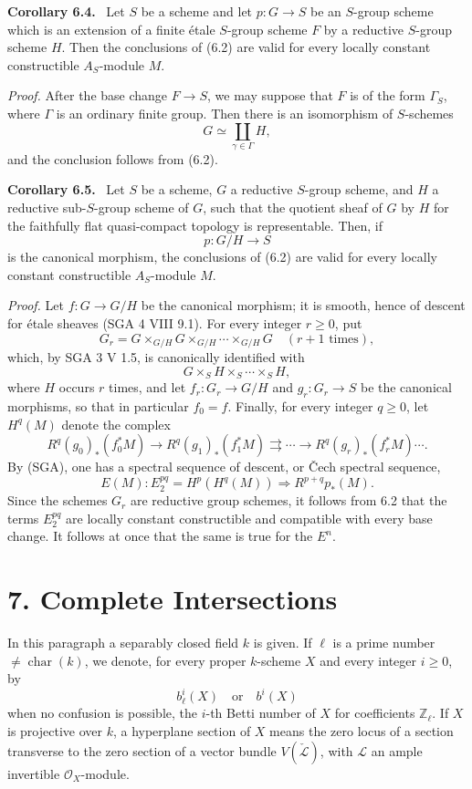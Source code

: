 \documentclass[11pt]{article}
\newenvironment{statement}[1]{\par\medskip\noindent\textbf{#1.}\ }{\par\medskip}
\begin{document}
\begin{statement}{Corollary 6.4}
Let $S$ be a scheme and let $p:G\to S$ be an $S$-group scheme which is an extension of a finite étale $S$-group scheme $F$ by a reductive $S$-group scheme $H$. Then the conclusions of (6.2) are valid for every locally constant constructible $A_S$-module $M$.
\end{statement}

\emph{Proof.} After the base change $F\to S$, we may suppose that $F$ is of the form $\Gamma_S$, where $\Gamma$ is an ordinary finite group. Then there is an isomorphism of $S$-schemes
\[
G\simeq\coprod_{\gamma\in\Gamma}H,
\]
and the conclusion follows from (6.2).

\begin{statement}{Corollary 6.5}
Let $S$ be a scheme, $G$ a reductive $S$-group scheme, and $H$ a reductive sub-$S$-group scheme of $G$, such that the quotient sheaf of $G$ by $H$ for the faithfully flat quasi-compact topology is representable. Then, if
\[
p:G/H\to S
\]
is the canonical morphism, the conclusions of (6.2) are valid for every locally constant constructible $A_S$-module $M$.
\end{statement}

\emph{Proof.} Let $f:G\to G/H$ be the canonical morphism; it is smooth, hence of descent for étale sheaves (SGA 4 VIII 9.1). For every integer $r\ge0$, put
\[
G_r=G\times_{G/H}G\times_{G/H}\cdots\times_{G/H}G
\quad(r+1\text{ times}),
\]
which, by SGA 3 V 1.5, is canonically identified with
\[
G\times_S H\times_S\cdots\times_S H,
\]
where $H$ occurs $r$ times, and let $f_r:G_r\to G/H$ and $g_r:G_r\to S$ be the canonical morphisms, so that in particular $f_0=f$. Finally, for every integer $q\ge0$, let $H^q(M)$ denote the complex
\[
R^q(g_0)_*(f_0^*M)\to R^q(g_1)_*(f_1^*M)\rightrightarrows\cdots\to R^q(g_r)_*(f_r^*M)\cdots .
\]
By (SGA), one has a spectral sequence of descent, or Čech spectral sequence,
\[
E(M):E_2^{pq}=H^p(H^q(M))\Rightarrow R^{p+q}p_*(M).
\]
Since the schemes $G_r$ are reductive group schemes, it follows from 6.2 that the terms $E_2^{pq}$ are locally constant constructible and compatible with every base change. It follows at once that the same is true for the $E^n$.

\section*{7. Complete Intersections}

In this paragraph a separably closed field $k$ is given. If $\ell$ is a prime number $\ne\operatorname{char}(k)$, we denote, for every proper $k$-scheme $X$ and every integer $i\ge0$, by
\[
b_\ell^i(X)\quad\text{or}\quad b^i(X)
\]
when no confusion is possible, the $i$-th Betti number of $X$ for coefficients $\mathbb Z_\ell$. If $X$ is projective over $k$, a hyperplane section of $X$ means the zero locus of a section transverse to the zero section of a vector bundle $V(\check{\mathcal L})$, with $\mathcal L$ an ample invertible $\mathcal O_X$-module.
\end{document}
